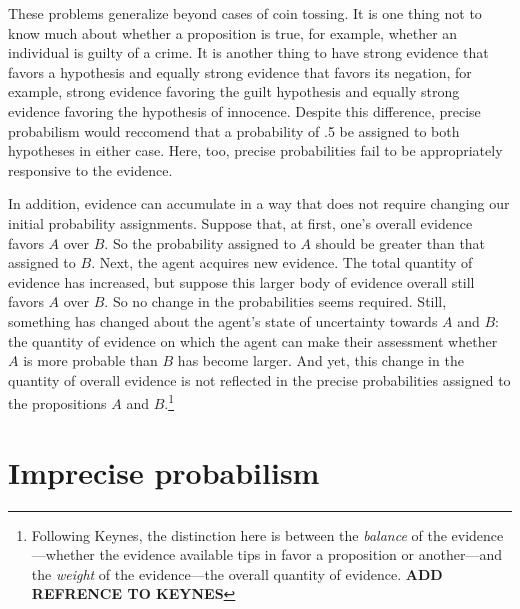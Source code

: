 \documentclass[
  letterpaper,
  DIV=11,
  numbers=noendperiod]{scrartcl}
\begin{document}
These problems generalize beyond cases of coin tossing. It is one thing
not to know much about whether a proposition is true, for example,
whether an individual is guilty of a crime. It is another thing to have
strong evidence that favors a hypothesis and equally strong evidence
that favors its negation, for example, strong evidence favoring the
guilt hypothesis and equally strong evidence favoring the hypothesis of
innocence. Despite this difference, precise probabilism would reccomend
that a probability of .5 be assigned to both hypotheses in either case.
Here, too, precise probabilities fail to be appropriately responsive to
the evidence.

In addition, evidence can accumulate in a way that does not require
changing our initial probability assignments. Suppose that, at first,
one's overall evidence favors \(A\) over \(B\). So the probability
assigned to \(A\) should be greater than that assigned to \(B\). Next,
the agent acquires new evidence. The total quantity of evidence has
increased, but suppose this larger body of evidence overall still favors
\(A\) over \(B\). So no change in the probabilities seems required.
Still, something has changed about the agent's state of uncertainty
towards \(A\) and \(B\): the quantity of evidence on which the agent can
make their assessment whether \(A\) is more probable than \(B\) has
become larger. And yet, this change in the quantity of overall evidence
is not reflected in the precise probabilities assigned to the
propositions \(A\) and \(B\).\footnote{Following Keynes, the distinction
  here is between the \emph{balance} of the evidence---whether the
  evidence available tips in favor a proposition or another---and the
  \emph{weight} of the evidence---the overall quantity of evidence.
  \textbf{ADD REFRENCE TO KEYNES}}

\hypertarget{imprecise-probabilism}{%
\section{Imprecise probabilism}\label{imprecise-probabilism}}

\label{sec:imprecise-probabilism}
\end{document}
